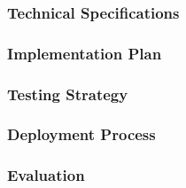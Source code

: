 \subsubsection{Technical Specifications}

\subsubsection{Implementation Plan}


\subsubsection{Testing Strategy}


\subsubsection{Deployment Process}

\subsubsection{Evaluation }



%
%


